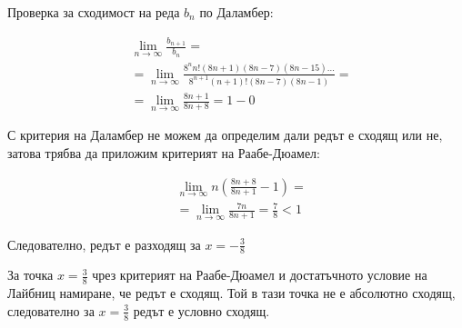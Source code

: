 \documentclass{article}
\begin{document}
Проверка за сходимост на реда \( {b_n} \) по Даламбер:

\begin{align*}
    & \lim_{n \to \infty}\frac{b_{n+1}}{b_n} = \\
    &= \lim_{n \to \infty} \frac{8^nn!(8n+1)(8n-7)(8n-15)...}{8^{n+1}(n+1)!(8n-7)(8n-1)} = \\
    &= \lim_{n \to \infty} \frac{8n+1}{8n+8} = 1 - 0
\end{align*}

С критерия на Даламбер не можем да определим дали редът е сходящ или не, затова трябва да приложим критерият на Раабе-Дюамел:

\begin{align*}
    &\lim_{n \to \infty} n\left( \frac{8n+8}{8n+1} - 1 \right) = \\
    &= \lim_{n \to \infty} \frac{7n}{8n+1} = \frac{7}{8} < 1
\end{align*}

Следователно, редът е разходящ за \( x = -\frac{3}{8} \)

За точка \( x = \frac{3}{8} \) чрез критерият на Раабе-Дюамел и достатъчното условие на Лайбниц намиране, че редът е сходящ. Той в тази точка не е абсолютно сходящ, следователно за \( x = \frac{3}{8} \) редът е условно сходящ.
\end{document}
